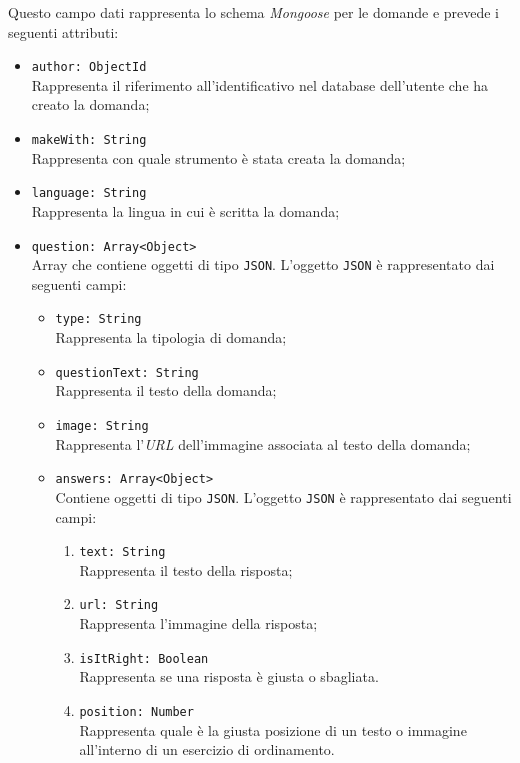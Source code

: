 \begin{itemize}
\begin{itemize}
		Questo campo dati rappresenta lo schema \textit{Mongoose} per le domande e prevede i seguenti attributi:
		\begin{itemize}
			\item \texttt{author: ObjectId}\\ Rappresenta il riferimento all'identificativo nel database dell'utente che ha creato la domanda;
			\item \texttt{makeWith: String}\\ Rappresenta con quale strumento è stata creata la domanda;
			\item \texttt{language: String}\\ Rappresenta la lingua in cui è scritta la domanda; 
			\item \texttt{question: Array<Object>}\\ Array che contiene oggetti di tipo \texttt{JSON}. L'oggetto \texttt{JSON} è rappresentato dai seguenti campi:
				\begin{itemize}
					\item \texttt{type: String}\\ Rappresenta la tipologia di domanda; 
					\item \texttt{questionText: String}\\ Rappresenta il testo della domanda; 
					\item \texttt{image: String}\\ Rappresenta l'\textit{URL} dell'immagine associata al testo della domanda; 
					\item \texttt{answers: Array<Object>}\\ Contiene oggetti di tipo \texttt{JSON}. L'oggetto \texttt{JSON} è rappresentato dai seguenti campi:
					\begin{enumerate}	
										  
						\item \texttt{text: String}\\ Rappresenta il testo della risposta;
        				\item \texttt{url: String}\\ Rappresenta l'immagine della risposta;
        					
        				\item \texttt{isItRight: Boolean}\\ Rappresenta se una risposta è giusta o sbagliata.
        						
	        			\item \texttt{position: Number}\\ Rappresenta quale è la giusta posizione di un testo o immagine all'interno di un esercizio di ordinamento.
        						

\end{enumerate}
\end{itemize}
\end{itemize}
\end{itemize}
\end{itemize}

